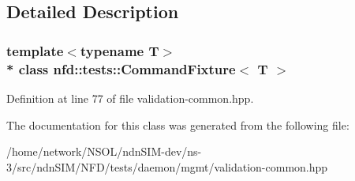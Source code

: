 \subsection{Detailed Description}
\subsubsection*{template$<$typename T$>$\\*
class nfd\+::tests\+::\+Command\+Fixture$<$ T $>$}



Definition at line 77 of file validation-\/common.\+hpp.



The documentation for this class was generated from the following file\+:\begin{DoxyCompactItemize}
\item 
/home/network/\+N\+S\+O\+L/ndn\+S\+I\+M-\/dev/ns-\/3/src/ndn\+S\+I\+M/\+N\+F\+D/tests/daemon/mgmt/validation-\/common.\+hpp\end{DoxyCompactItemize}
